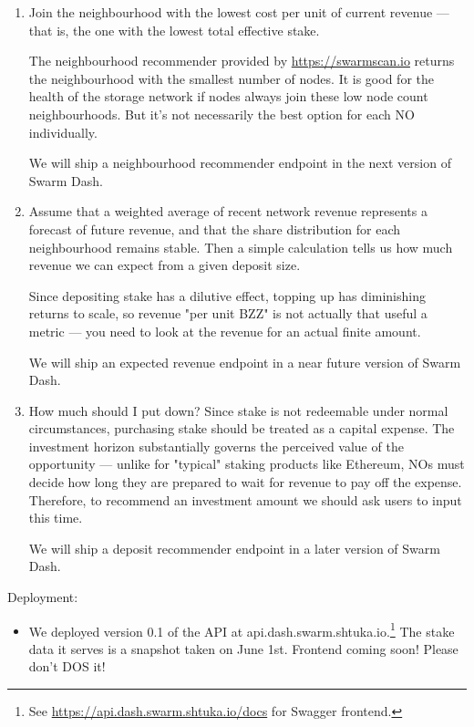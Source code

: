 \begin{enumerate}
\item Join the neighbourhood with the lowest cost per unit of current revenue — that is, the one with the lowest total effective stake.

   The neighbourhood recommender provided by \url{https://swarmscan.io} returns the neighbourhood with the smallest number of nodes. It is good for the health of the storage network if nodes always join these low node count neighbourhoods. But it's not necessarily the best option for each NO individually.
   
   We will ship a neighbourhood recommender endpoint in the next version of Swarm Dash.

\item Assume that a weighted average of recent network revenue represents a forecast of future revenue, and that the share distribution for each neighbourhood remains stable. Then a simple calculation tells us how much revenue we can expect from a given deposit size. 

   Since depositing stake has a dilutive effect, topping up has diminishing returns to scale, so revenue "per unit BZZ" is not actually that useful a metric — you need to look at the revenue for an actual finite amount.
   
   We will ship an expected revenue endpoint in a near future version of Swarm Dash.

\item How much should I put down?
   Since stake is not redeemable under normal circumstances, purchasing stake should be treated as a capital expense. The investment horizon substantially governs the perceived value of the opportunity — unlike for "typical" staking products like Ethereum, NOs must decide how long they are prepared to wait for revenue to pay off the expense. Therefore, to recommend an investment amount we should ask users to input this time.
   
   We will ship a deposit recommender endpoint in a later version of Swarm Dash.
\end{enumerate}

Deployment:

\begin{itemize}
\item We deployed version 0.1 of the API at api.dash.swarm.shtuka.io.\footnote{See \url{https://api.dash.swarm.shtuka.io/docs} for Swagger frontend.} The stake data it serves is a snapshot taken on June 1st. Frontend coming soon! Please don't DOS it!
\end{itemize}

